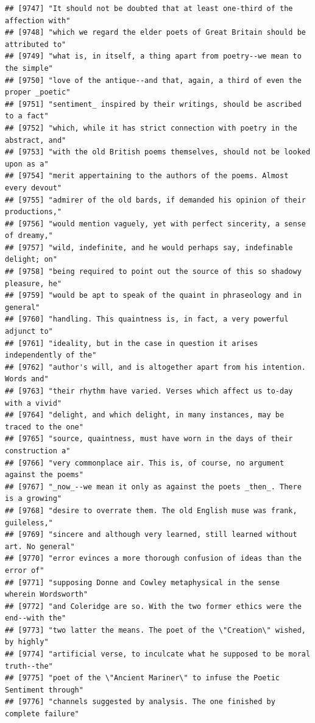 \documentclass{article}\usepackage[]{graphicx}\usepackage[]{color}
\makeatletter
\newenvironment{kframe}{%
 \def\at@end@of@kframe{}%
 \ifinner\ifhmode%
  \def\at@end@of@kframe{\end{minipage}}%
  \begin{minipage}{\columnwidth}%
 \fi\fi%
 \def\FrameCommand##1{\hskip\@totalleftmargin \hskip-\fboxsep
 \colorbox{shadecolor}{##1}\hskip-\fboxsep
     \hskip-\linewidth \hskip-\@totalleftmargin \hskip\columnwidth}%
 \MakeFramed {\advance\hsize-\width
   \@totalleftmargin\z@ \linewidth\hsize
   \@setminipage}}%
 {\par\unskip\endMakeFramed%
 \at@end@of@kframe}
\newenvironment{knitrout}{}{} %
\makeatother
\begin{document}
\begin{knitrout}
\begin{kframe}
\begin{verbatim}
## [9747] "It should not be doubted that at least one-third of the affection with"      
## [9748] "which we regard the elder poets of Great Britain should be attributed to"    
## [9749] "what is, in itself, a thing apart from poetry--we mean to the simple"        
## [9750] "love of the antique--and that, again, a third of even the proper _poetic"    
## [9751] "sentiment_ inspired by their writings, should be ascribed to a fact"         
## [9752] "which, while it has strict connection with poetry in the abstract, and"      
## [9753] "with the old British poems themselves, should not be looked upon as a"       
## [9754] "merit appertaining to the authors of the poems. Almost every devout"         
## [9755] "admirer of the old bards, if demanded his opinion of their productions,"     
## [9756] "would mention vaguely, yet with perfect sincerity, a sense of dreamy,"       
## [9757] "wild, indefinite, and he would perhaps say, indefinable delight; on"         
## [9758] "being required to point out the source of this so shadowy pleasure, he"      
## [9759] "would be apt to speak of the quaint in phraseology and in general"           
## [9760] "handling. This quaintness is, in fact, a very powerful adjunct to"           
## [9761] "ideality, but in the case in question it arises independently of the"        
## [9762] "author's will, and is altogether apart from his intention. Words and"        
## [9763] "their rhythm have varied. Verses which affect us to-day with a vivid"        
## [9764] "delight, and which delight, in many instances, may be traced to the one"     
## [9765] "source, quaintness, must have worn in the days of their construction a"      
## [9766] "very commonplace air. This is, of course, no argument against the poems"     
## [9767] "_now_--we mean it only as against the poets _then_. There is a growing"      
## [9768] "desire to overrate them. The old English muse was frank, guileless,"         
## [9769] "sincere and although very learned, still learned without art. No general"    
## [9770] "error evinces a more thorough confusion of ideas than the error of"          
## [9771] "supposing Donne and Cowley metaphysical in the sense wherein Wordsworth"     
## [9772] "and Coleridge are so. With the two former ethics were the end--with the"     
## [9773] "two latter the means. The poet of the \"Creation\" wished, by highly"        
## [9774] "artificial verse, to inculcate what he supposed to be moral truth--the"      
## [9775] "poet of the \"Ancient Mariner\" to infuse the Poetic Sentiment through"      
## [9776] "channels suggested by analysis. The one finished by complete failure"        

\end{verbatim}
\end{kframe}
\end{knitrout}
\end{document}
